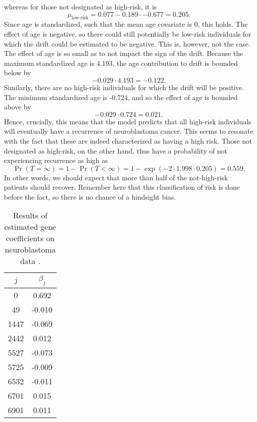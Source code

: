 whereas for those not designated as high-risk, it is
\begin{equation}
    \mu_{\text{low-risk}}=0.077-0.189\cdot-0.677=0.205.
\end{equation}
Since age is standardized, such that the mean age covariate is 0, this holds.
The effect of age is negative, so there could still potentially be low-risk individuals for which the drift could be estimated to be negative.
This is, however, not the case.
The effect of age is so small as to not impact the sign of the drift.
Because the maximum standardized age is 4.193, the age contribution to drift is bounded below by 
\begin{equation*}
    -0.029\cdot4.193=-0.122.
\end{equation*}
Similarly, there are no high-risk individuals for which the drift will be positive.
The minimum standardized age is -0.724, and so the effect of age is bounded above by
\begin{equation*}
    -0.029\cdot0.724=0.021.
\end{equation*}
Hence, crucially, this means that the model predicts that all high-risk individuals will eventually have a recurrence of neuroblastoma cancer.
This seems to resonate with the fact that these are indeed characterized as having a high risk.
Those not designated as high-risk, on the other hand, thus have a probability of not experiencing recurrence as high as
\begin{equation*}
    \Pr{(T=\infty)}=1-\Pr{(T<\infty)}=1-\exp{(-2\cdot 1.998\cdot 0.205)}=0.559.
\end{equation*}
In other words, we should expect that more than half of the not-high-risk patients should recover.
Remember here that this classification of risk is done before the fact, so there is no chance of a hindsight bias.


\begin{table}
\caption{Results of estimated gene coefficients on neuroblastoma data \citep{oberthuer-data}.}
\label{tab:oberthuer-beta}
\centering
\begin{tabular}{cc}
\toprule
$j$ & $\beta_j$ \\
\hline
0 & 0.692 \\
49 & -0.010 \\
1447 & -0.069 \\
2442 & 0.012 \\
5527 & -0.073 \\
5725 & -0.009 \\
6532 & -0.011 \\
6701 & 0.015 \\
6901 & 0.011 \\
\bottomrule
\end{tabular}
\end{table}

